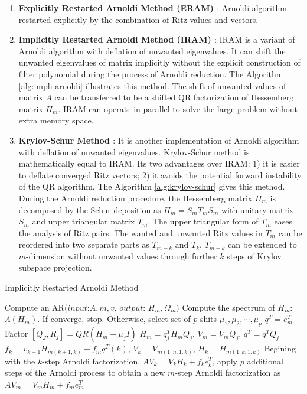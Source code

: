 \begin{enumerate}
	\item \textbf{Explicitly Restarted Arnoldi Method (ERAM) \cite{morgan1996restarting}}: Arnoldi algorithm restarted explicitly by the combination of Ritz values and vectors.
	
	\item \textbf{Implicitly Restarted Arnoldi Method (IRAM) \cite{sorensen1997implicitly}}: IRAM is a variant of Arnoldi algorithm with deflation of unwanted eigenvalues. It can shift the unwanted eigenvalues of matrix implicitly without the explicit construction of filter polynomial during the process of Arnoldi reduction. The Algorithm \ref{alg:impli-arnoldi} illustrates this method. The shift of unwanted values of matrix $A$ can be transferred to be a shifted QR factorization of Hessemberg matrix $H_m$. IRAM can operate in parallel to solve the large problem without extra memory space.
	
	\item \textbf{Krylov-Schur Method \cite{stewart2002krylov}}: It is another implementation of Arnoldi algorithm with deflation of unwanted eigenvalues. Krylov-Schur method is mathematically equal to IRAM. Its two advantages over IRAM: 1) it is easier to deflate converged Ritz vectors; 2) it avoids the potential forward instability of the QR algorithm. The Algorithm \ref{alg:krylov-schur} gives this method. During the Arnoldi reduction procedure, the Hessemberg matrix $H_m$ is decomposed by the Schur deposition as $H_m=S_mT_mS_m$ with unitary matrix $S_m$ and upper triangular matrix $T_m$. The upper triangular form of $T_m$ eases the analysis of Ritz pairs. The wanted and unwanted Ritz values in $T_m$ can be reordered into two separate parts as $T_{m-k}$ and $T_k$. $T_{m-k}$ can be extended to $m$-dimension without unwanted values through further $k$ steps of Krylov subspace projection. 
	
\end{enumerate}

\begin{algorithm}[t]{}
	\caption{Implicitly Restarted Arnoldi Method}   
	\label{alg:impli-arnoldi}   
	\begin{algorithmic}[1]
		\State Compute an AR($input$:$A,m,v$, $output$: $H_m, \Omega_m$)
		\State Compute the spectrum of $H_m$: $\Lambda (H_m)$. If converge, stop. Otherwise, select set of $p$ shits $\mu_1, \mu_2,\cdots, \mu_p$
		\State $q^T = e_m^T$
		\State Factor $[Q_J, R_j] = QR(H_m-\mu_jI)$
		\State $H_m = q_j^TH_mQ_j$, $V_m=V_mQ_j$, $q^T=q^TQ_j$
		\EndFor 
		\State $f_k=v_{k+1}H_{m(k+1,k)}+f_mq^T(k)$, $V_k=V_{m(1:n,1:k)}$, $H_k=H_{m(1:k,1:k)}$
		\State Begining with the $k$-step Arnoldi factorization, $AV_k=V_kH_k+f_ke_k^T$, apply $p$ additional steps of the Arnoldi process to obtain a new $m$-step Arnoldi factorization as $AV_m=V_mH_m+f_me_m^T$
		\EndFunction
	\end{algorithmic}  
\end{algorithm}

